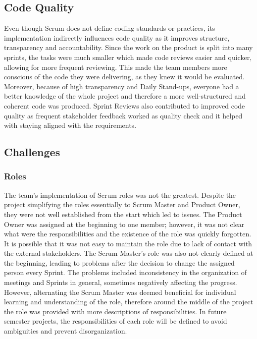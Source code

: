\subsection*{Code Quality}
Even though Scrum does not define coding standards or practices, its implementation indirectly influences code quality as it improves structure, transparency and accountability. Since the work on the product is split into many sprints, the tasks were much smaller which made code reviews easier and quicker, allowing for more frequent reviewing. This made the team members more conscious of the code they were delivering, as they knew it would be evaluated. Moreover, because of high transparency and Daily Stand-ups, everyone had a better knowledge of the whole project and therefore a more well-structured and coherent code was produced. Sprint Reviews also contributed to improved code quality as frequent stakeholder feedback worked as quality check and it helped with staying aligned with the requirements.

\subsection*{Challenges}
\subsubsection*{Roles}
The team's implementation of Scrum roles was not the greatest. Despite the project simplifying the roles essentially to Scrum Master and Product Owner, they were not well established from the start which led to issues. The Product Owner was assigned at the beginning to one member; however, it was not clear what were the responsibilities and the existence of the role was quickly forgotten. It is possible that it was not easy to maintain the role due to lack of contact with the external stakeholders. The Scrum Master's role was also not clearly defined at the beginning, leading to problems after the decision to change the assigned person every Sprint. The problems included inconsistency in the organization of meetings and Sprints in general, sometimes negatively affecting the progress. However, alternating the Scrum Master was deemed beneficial for individual learning and understanding of the role, therefore around the middle of the project the role was provided with more descriptions of responsibilities. In future semester projects, the responsibilities of each role will be defined to avoid ambiguities and prevent disorganization.
